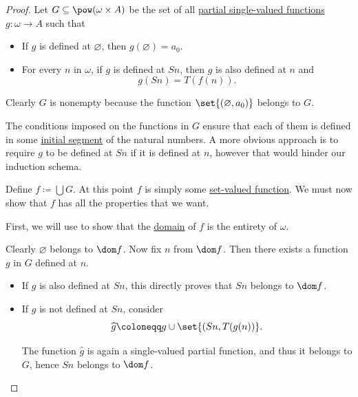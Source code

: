 \begin{proof}
  Let \( G \subseteq \pow(\omega \times A) \) be the set of all \hyperref[def:partial_function]{partial single-valued functions} \( g: \omega \to A \) such that
  \begin{itemize}
    \item If \( g \) is defined at \( \varnothing \), then \( g(\varnothing) = a_0 \).

    \item For every \( n \) in \( \omega \), if \( g \) is defined at \( Sn \), then \( g \) is also defined at \( n \) and
    \begin{equation*}
      g(Sn) = T(f(n)).
    \end{equation*}
  \end{itemize}

  Clearly \( G \) is nonempty because the function \( \set{ (\varnothing, a_0) } \) belongs to \( G \).

  The conditions imposed on the functions in \( G \) ensure that each of them is defined in some \hyperref[def:order_interval/unbounded]{initial segment} of the natural numbers. A more obvious approach is to require \( g \) to be defined at \( Sn \) if it is defined at \( n \), however that would hinder our induction schema.

  Define \( f \coloneqq \bigcup G \). At this point \( f \) is simply some \hyperref[def:function]{set-valued function}. We must now show that \( f \) has all the properties that we want.

   First, we will use  to show that the \hyperref[def:set_valued_function/domain]{domain} of \( f \) is the entirety of \( \omega \).

  Clearly \( \varnothing \) belongs to \( \dom f \). Now fix \( n \) from \( \dom f \). Then there exists a function \( g \) in \( G \) defined at \( n \).

  \begin{itemize}
    \item If \( g \) is also defined at \( Sn \), this directly proves that \( Sn \) belongs to \( \dom f \).

    \item If \( g \) is not defined at \( Sn \), consider
    \begin{equation*}
      \widehat g \coloneqq g \cup \set{ (Sn, T(g(n)) }.
    \end{equation*}

    The function \( \widehat g \) is again a single-valued partial function, and thus it belongs to \( G \), hence \( Sn \) belongs to \( \dom f \).
  \end{itemize}


\end{proof}
